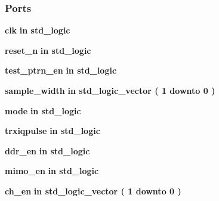 \subsubsection*{Ports}
 \begin{DoxyCompactItemize}
\item 
{\bf clk}  {\bfseries {\bfseries \textcolor{keywordflow}{in}\textcolor{vhdlchar}{ }}} {\bfseries \textcolor{comment}{std\+\_\+logic}\textcolor{vhdlchar}{ }} 
\item 
{\bf reset\+\_\+n}  {\bfseries {\bfseries \textcolor{keywordflow}{in}\textcolor{vhdlchar}{ }}} {\bfseries \textcolor{comment}{std\+\_\+logic}\textcolor{vhdlchar}{ }} 
\item 
{\bf test\+\_\+ptrn\+\_\+en}  {\bfseries {\bfseries \textcolor{keywordflow}{in}\textcolor{vhdlchar}{ }}} {\bfseries \textcolor{comment}{std\+\_\+logic}\textcolor{vhdlchar}{ }} 
\item 
{\bf sample\+\_\+width}  {\bfseries {\bfseries \textcolor{keywordflow}{in}\textcolor{vhdlchar}{ }}} {\bfseries \textcolor{comment}{std\+\_\+logic\+\_\+vector}\textcolor{vhdlchar}{ }\textcolor{vhdlchar}{(}\textcolor{vhdlchar}{ }\textcolor{vhdlchar}{ } \textcolor{vhdldigit}{1} \textcolor{vhdlchar}{ }\textcolor{keywordflow}{downto}\textcolor{vhdlchar}{ }\textcolor{vhdlchar}{ } \textcolor{vhdldigit}{0} \textcolor{vhdlchar}{ }\textcolor{vhdlchar}{)}\textcolor{vhdlchar}{ }} 
\item 
{\bf mode}  {\bfseries {\bfseries \textcolor{keywordflow}{in}\textcolor{vhdlchar}{ }}} {\bfseries \textcolor{comment}{std\+\_\+logic}\textcolor{vhdlchar}{ }} 
\item 
{\bf trxiqpulse}  {\bfseries {\bfseries \textcolor{keywordflow}{in}\textcolor{vhdlchar}{ }}} {\bfseries \textcolor{comment}{std\+\_\+logic}\textcolor{vhdlchar}{ }} 
\item 
{\bf ddr\+\_\+en}  {\bfseries {\bfseries \textcolor{keywordflow}{in}\textcolor{vhdlchar}{ }}} {\bfseries \textcolor{comment}{std\+\_\+logic}\textcolor{vhdlchar}{ }} 
\item 
{\bf mimo\+\_\+en}  {\bfseries {\bfseries \textcolor{keywordflow}{in}\textcolor{vhdlchar}{ }}} {\bfseries \textcolor{comment}{std\+\_\+logic}\textcolor{vhdlchar}{ }} 
\item 
{\bf ch\+\_\+en}  {\bfseries {\bfseries \textcolor{keywordflow}{in}\textcolor{vhdlchar}{ }}} {\bfseries \textcolor{comment}{std\+\_\+logic\+\_\+vector}\textcolor{vhdlchar}{ }\textcolor{vhdlchar}{(}\textcolor{vhdlchar}{ }\textcolor{vhdlchar}{ } \textcolor{vhdldigit}{1} \textcolor{vhdlchar}{ }\textcolor{keywordflow}{downto}\textcolor{vhdlchar}{ }\textcolor{vhdlchar}{ } \textcolor{vhdldigit}{0} \textcolor{vhdlchar}{ }\textcolor{vhdlchar}{)}\textcolor{vhdlchar}{ }} 

\end{DoxyCompactItemize}
